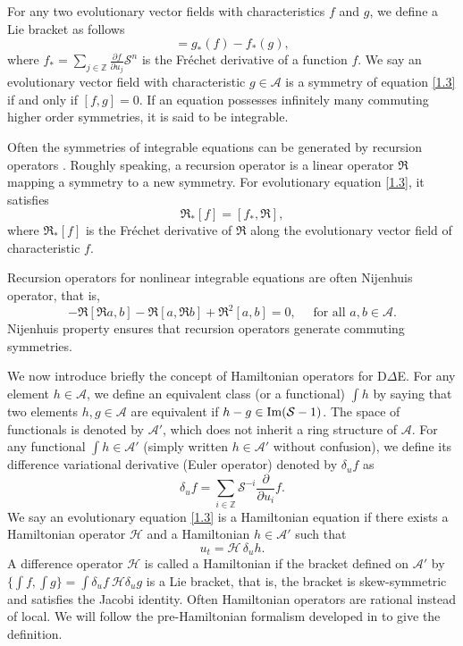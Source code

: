 \documentclass{article}
\numberwithin{equation}{section}
\newcommand\cH{{\mathcal H}}
\newcommand\cS{{\mathcal S}}
\newcommand\cA{{\mathcal A}}
\begin{document}
For any two evolutionary vector fields with characteristics $f$ and $g$, we define a Lie bracket
as follows
\begin{equation*}
		[f,g] = g_*(f)-f_*(g),
		\label{r5}
	\end{equation*}
where $
		f_* = \sum_{j \in \mathbb{Z}} \frac{\partial f}{\partial u_j}
\mathcal{S}^n $
is the Fr\'echet derivative of a function $f$.  We say an evolutionary vector field with characteristic $g\in \mathcal{A}$ is a symmetry of equation \eqref{1.3}
if and only if $[f, g ] = 0$. If an equation possesses infinitely many commuting higher order symmetries, it is said to be integrable.

Often the symmetries of integrable equations can be generated by recursion operators \cite{55}.
Roughly speaking, a recursion operator is a linear operator $\mathfrak{R}$ mapping a symmetry to
a new symmetry. For evolutionary equation \eqref{1.3}, it satisfies
	\begin{equation}
		\mathfrak{R}_*[f]=[f_*, \mathfrak{R}],
		\label{1.4}
	\end{equation}
	where $\mathfrak{R}_*[f]$  is the Fr\'echet derivative of $\mathfrak{R}$ along the evolutionary vector field  of characteristic $f$.

Recursion operators for nonlinear integrable equations are often Nijenhuis operator, that is,
\begin{equation}
		[\mathfrak{R} a, \mathfrak{R} b] - \mathfrak{R} [\mathfrak{R} a, b] - \mathfrak{R}[a, \mathfrak{R} b] + \mathfrak{R}^2[a, b] = 0, \quad \mbox{ for all $a, b \in \cA$.}
		\label{Nijen1}
	\end{equation}
Nijenhuis property ensures that recursion operators generate commuting symmetries.


We now introduce briefly the concept of Hamiltonian operators for D$\Delta$E.
For any element $h \in \mathcal{A}$, we define an equivalent class (or a functional) $\int h$ by
saying that two elements $h, g \in \mathcal{A}$ are equivalent if $h -g \in {\rm Im}(\cS -1)$. The space of functionals
is denoted by $\mathcal{A}'$, which does not inherit a ring structure of $\mathcal{A}$.
For any functional $\int h \in \cA'$ (simply written $h \in \cA'$ without confusion), we define its difference variational derivative (Euler operator) denoted by
$\delta_u f$ as
	\begin{equation*}
		\delta_u f  =\sum_{i \in \mathbb{Z}} \mathcal{S}^{-i}
\frac{\partial }{\partial u_i} f .
	\end{equation*}
We say an evolutionary equation \eqref{1.3} is a
Hamiltonian equation if there exists a Hamiltonian operator $\cH$ and a Hamiltonian $h\in \cA'$ such that
	\begin{equation*}
		u_t = \mathcal{H}\, \delta_u  h .
		\label{Ham1}
	\end{equation*}
A difference operator $\cH$ is called a Hamiltonian if the bracket defined on $\cA'$ by
$\{\int\!\! f, \int\!\! g\}=\int\! \delta_u f\ \cH \delta_u g$ is a Lie bracket, that is, the bracket is skew-symmetric and satisfies the Jacobi identity.
Often Hamiltonian operators are rational instead of local.
We will follow the pre-Hamiltonian formalism developed in \cite{4, 42} to give the definition.
\end{document}
